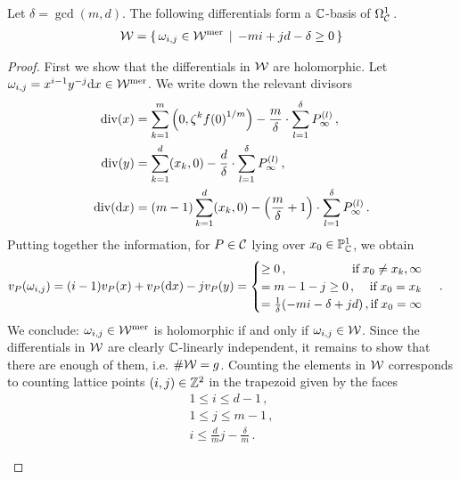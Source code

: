 \documentclass[main.tex]{subfiles}
\begin{document}
     \begin{prop}\label{prop:holom_diff}
	Let $\delta = \gcd(m,d)$. The following differentials form  a $\mathbb{C}$-basis of $\Omega^1_{\mathcal{C}}$\,.
	\begin{align}\label{eq:holm_diff}
	  \mathcal{W} =  \left\{ \, \omega_{i,j} \in \mathcal{W}^{\text{mer}} \, \mid \, -mi + jd - \delta \ge 0 \, \right\}
	\end{align}
     \end{prop}
     \begin{proof}
      First we show that the differentials in $\mathcal{W}$ are holomorphic.
      Let $\omega_{i,j} = x^{i-1}y^{-j} \mathrm d x \in \mathcal{W}^{\text{mer}}$. We write down the relevant divisors
      \begin{align*}
       \operatorname{div}(x) & = \sum_{k=1}^m \left(0,\zeta^k{f(0)}^{1/m}\right) - \frac{m}{\delta} \cdot \sum_{l = 1}^{\delta} P_{\infty}^{(l)}\,, \\
       \operatorname{div}(y) & = \sum_{k = 1}^d (x_k,0) - \frac{d}{\delta} \cdot \sum_{l = 1}^{\delta}  P_{\infty}^{(l)}\,, \\
       \operatorname{div}(\mathrm d x) & = (m-1)\sum_{k = 1}^d (x_k,0) - \left(\frac{m}{\delta} + 1\right)\cdot \sum_{l = 1}^{\delta}  P_{\infty}^{(l)}\,.
      \end{align*}
     Putting together the information, for $P \in \mathcal{C}$ lying over $x_0 \in \mathbb{P}^1_{\mathbb{C}}$, we obtain
     \begin{align}\label{eq:diff_cases}
      v_P(\omega_{i,j}) & = (i-1) v_P(x) + v_P(\dx)  - j v_P(y) = 
	\begin{cases}
	 \ge 0\,, \hfill \text{if} \; x_0 \ne x_k,\infty \\
	 = m-1-j \ge 0 \,, \hfill \text{if} \; x_0 = x_k \\
	 = \frac{1}{\delta}(-mi-\delta+jd)\,,\hfill \text{if} \; x_0 = \infty
	\end{cases}\,.
     \end{align}
     We conclude: $\omega_{i,j} \in \mathcal{W}^{\text{mer}}$ is holomorphic if and only if $\omega_{i,j} \in \mathcal{W}$. \abstand
     Since the differentials in $\mathcal{W}$ are clearly $\mathbb{C}$-linearly independent, it remains to show that
     there are enough of them, i.e. $\#\mathcal{W} = g$. \abstand
     Counting the elements in $\mathcal{W}$ corresponds to counting lattice points $(i,j) \in \mathbb{Z}^2$ in the trapezoid given by the faces
     \begin{align*}
	1 \le i \le d-1\,,\\
	1 \le j \le m-1\,, \\
	i \le \frac{d}{m}j - \frac{\delta}{m}\,.
     \end{align*}
      \begin{figure}[H]

\end{figure}
\end{proof}
\end{document}
